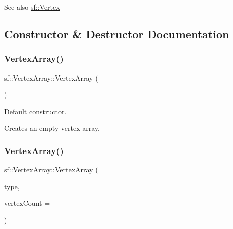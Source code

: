 \begin{DoxySeeAlso}{See also}
\mbox{\hyperlink{classsf_1_1_vertex}{sf\+::\+Vertex}} \begin{DoxyVerb}\end{DoxyVerb}
 
\end{DoxySeeAlso}


\subsection{Constructor \& Destructor Documentation}
\mbox{\label{classsf_1_1_vertex_array_a15729e01df8fc0021f9774dfb56295c1}} 
\subsubsection{\texorpdfstring{VertexArray()}{VertexArray()}\hspace{0.1cm}{\footnotesize\ttfamily [1/2]}}
{\footnotesize\ttfamily sf\+::\+Vertex\+Array\+::\+Vertex\+Array (\begin{DoxyParamCaption}{ }\end{DoxyParamCaption})}



Default constructor. 

Creates an empty vertex array. \begin{DoxyVerb}\end{DoxyVerb}
 \mbox{\label{classsf_1_1_vertex_array_a4bb1c29a0e3354a035075899d84f02f9}} 
\subsubsection{\texorpdfstring{VertexArray()}{VertexArray()}\hspace{0.1cm}{\footnotesize\ttfamily [2/2]}}
{\footnotesize\ttfamily sf\+::\+Vertex\+Array\+::\+Vertex\+Array (\begin{DoxyParamCaption}\item[{\mbox{\hyperlink{group__graphics_ga5ee56ac1339984909610713096283b1b}{Primitive\+Type}}}]{type,  }\item[{std\+::size\+\_\+t}]{vertex\+Count = {} }\end{DoxyParamCaption})\hspace{0.3cm}{\ttfamily [explicit]}}




